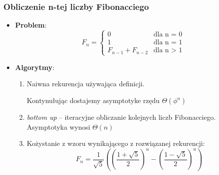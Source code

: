 \documentclass[11pt,a4paper]{article}
\begin{document}
\subsubsection{Obliczenie n-tej liczby Fibonacciego}
\begin{itemize}
    \item \textbf{Problem}:
        \[
            F_n = \begin{cases}
                0 & \text{dla n = 0} \\
                1 & \text{dla n = 1} \\
                F_{n-1} + F_{n-2} & \text{dla n > 1}
            \end{cases}
        \]
    \item \textbf{Algorytmy}:
        \begin{enumerate}
            \item Naiwna rekurencja używająca definicji.
                \begin{center}
                \end{center}
                Kontynułując dostajemy asymptotyke rzędu $\Theta(\phi^n)$
            \item \textit{bottom up} -- iteracyjne obliczanie kolejnych liczb Fibonacciego. Asymptotyka wynosi $\Theta(n)$
            \item Kożystanie z wzoru wynikającego z rozwiązanej rekurencji:
                \[
                    F_n = \frac{1}{\sqrt{5}} \left( \left(\frac{1+\sqrt{5}}{2}\right)^n - \left(\frac{1-\sqrt{5}}{2}\right)^n \right)
\]
\end{enumerate}
\end{itemize}
\end{document}

